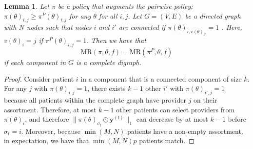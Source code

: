 \documentclass[11pt]{article}
\newtheorem{lemma}{Lemma}[section]
\begin{document}
\begin{lemma}
    \label{lem:augment}
    Let $\pi$ be a policy that augments the pairwise policy; $\pi(\theta)_{i,j} \geq \pi^{P}(\theta)_{i,j}$ for any $\theta$ for all $i,j$. 
    Let $G = (V,E)$ be a directed graph with $N$ nodes such that nodes $i$ and $i'$ are connected if $\pi(\theta)_{i,v(\theta)_{i'}} = 1$ . 
    Here, $v(\theta)_{i} = j$ if $\pi^{P}(\theta)_{i,j} = 1$.
    Then we have that
    \begin{equation}
        \mathrm{MR}(\pi,\theta,f) = \mathrm{MR}(\pi^{P},\theta,f) 
    \end{equation}
    if each component in $G$ is a complete digraph.  
\end{lemma}
\begin{proof}
Consider patient $i$ in a component that is a connected component of size $k$. 
For any $j$ with $\pi(\theta)_{i,j}=1$, there exists $k-1$ other $i'$ with $\pi(\theta)_{i',j}=1$ because all patients within the complete graph have provider $j$ on their assortment. 
Therefore, at most $k-1$ other patients can select providers from $\pi(\theta)_{i}$, and therefore $\lVert \pi(\theta)_{\sigma_{t}} \odot \mathbf{y}^{(t)} \rVert_{1}$ can decrease by at most $k-1$ before $\sigma_{t}=i$. 
Moreover, because $\min(M,N)$ patients have a non-empty assortment, in expectation, we have that $\min(M,N)p$ patients match.%



\end{proof}
\end{document}

